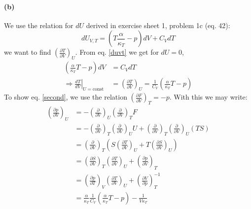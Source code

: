 \documentclass[a4paper]{article}
\newcommand{\pd}[3]{\left(\frac{\partial {#1}}{\partial {#2}}\right)_{#3}}
\begin{document}
\paragraph{(b)}
We use the relation for $dU$ derived in exercise sheet 1, problem 1c (eq. 42):
\begin{equation}
    dU_{V,T}=\left( T\frac{\alpha}{\kappa_T}-p \right) dV + C_V dT \label{duvt}
\end{equation}
we want to find $\pd{T}{V}{U}$. From eq. \ref{duvt} we get for $dU=0$,
\begin{align}
     \left( \frac{\alpha}{\kappa_T}T-p  \right)dV&=C_V dT \\
      \Rightarrow \left. \frac{dT}{dV}\right|_{U=\text{const}}&=\pd{T}{V}{U}=\frac{1}{C_V}\left( \frac{\alpha}{\kappa_T}T-p  \right)
\end{align}
To show eq. \ref{second}, we use the relation $\pd{F}{V}{T}=-p$. With this we may write:
\begin{align}
    \pd{p}{V}{U}&=-\pd{}{V}{U}\pd{}{V}{T}F \\
    &=-\pd{}{V}{T}\pd{}{V}{U}U+\pd{}{V}{T}\pd{}{V}{U}(TS) \\
    &=\pd{}{V}{T}\left( S\pd{T}{V}{U}+T\pd{S}{V}{U}  \right) \\
    &=\pd{S}{V}{T}\pd{T}{V}{U}+\pd{p}{V}{T} \\
    &=\pd{p}{T}{V}\pd{T}{V}{U}+\pd{V}{p}{T}^{-1} \\
    &=\frac{\alpha}{\kappa_T}\frac{1}{C_V}\left(\frac{\alpha}{\kappa_T}T-p\right)-\frac{1}{V\kappa_T}
\end{align}
\end{document}

